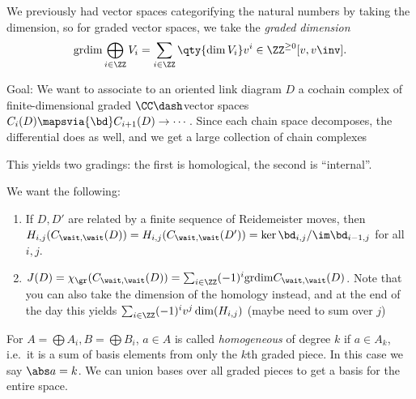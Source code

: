We previously had vector spaces categorifying the natural numbers by
taking the dimension, so for graded vector spaces, we take the
\emph{graded dimension} \begin{align*}
\mathrm{gr dim} \bigoplus_{i\in\ZZ}V_i = \sum_{i\in \ZZ}\qty{\dim V_i}v^i \in \ZZ^{\geq 0}[v, v\inv]
.\end{align*}

Goal: We want to associate to an oriented link diagram \(D\) a cochain
complex of finite-dimensional graded \(\CC\dash\)vector spaces
\(C_i(D) \mapsvia{\bd} C_{i+1}(D) \to \cdots\). Since each chain space
decomposes, the differential does as well, and we get a large collection
of chain complexes

\begin{center}
\end{center}

This yields two gradings: the first is homological, the second is
``internal''.

We want the following:

\begin{enumerate}
\def\labelenumi{\arabic{enumi}.}
\item
  If \(D, D'\) are related by a finite sequence of Reidemeister moves,
  then
  \(H_{i, j}(C_{\wait, \wait}(D)) = H_{i, j}(C_{\wait, \wait}(D')) = \ker \bd_{i, j} / \im \bd_{i-1, j}\)
  for all \(i, j\).
\item
  \(J(D) = \chi_{\gr}(C_{\wait, \wait}(D)) = \sum_{i\in \ZZ} (-1)^i \mathrm{gr dim} C_{\wait, \wait}(D)\).
  Note that you can also take the dimension of the homology instead, and
  at the end of the day this yields
  \(\sum_{i\in \ZZ} (-1)^i v^j \dim(H_{i, j})\) (maybe need to sum over
  \(j\))
\end{enumerate}

For \(A = \bigoplus A_i, B = \bigoplus B_i\), \(a\in A\) is called
\emph{homogeneous} of degree \(k\) if \(a\in A_k\), i.e.~it is a sum of
basis elements from only the \(k\)th graded piece. In this case we say
\(\abs a = k\). We can union bases over all graded pieces to get a basis
for the entire space.

